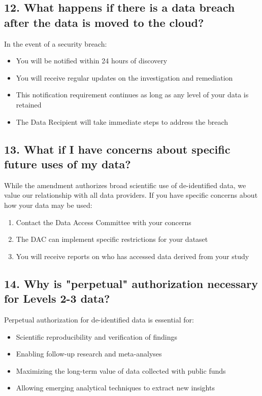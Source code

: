 \documentclass[12pt,letterpaper]{article}
\begin{document}
\subsection*{12. What happens if there is a data breach after the data is moved to the cloud?}

In the event of a security breach:
\begin{itemize}
\item You will be notified within 24 hours of discovery
\item You will receive regular updates on the investigation and remediation
\item This notification requirement continues as long as any level of your data is retained
\item The Data Recipient will take immediate steps to address the breach
\end{itemize}

\subsection*{13. What if I have concerns about specific future uses of my data?}

While the amendment authorizes broad scientific use of de-identified data, we value our relationship with all data providers. If you have specific concerns about how your data may be used:

\begin{enumerate}
\item Contact the Data Access Committee with your concerns
\item The DAC can implement specific restrictions for your dataset
\item You will receive reports on who has accessed data derived from your study
\end{enumerate}

\subsection*{14. Why is "perpetual" authorization necessary for Levels 2-3 data?}

Perpetual authorization for de-identified data is essential for:
\begin{itemize}
\item Scientific reproducibility and verification of findings
\item Enabling follow-up research and meta-analyses
\item Maximizing the long-term value of data collected with public funds
\item Allowing emerging analytical techniques to extract new insights
\end{itemize}
\end{document}
